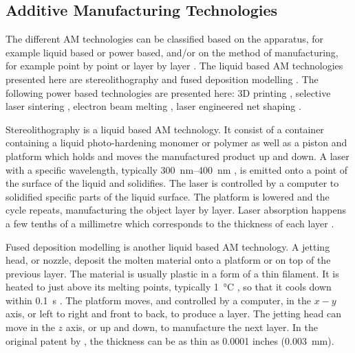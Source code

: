 \subsection{Additive Manufacturing Technologies}

The different AM technologies can be classified based on the apparatus, for example liquid based or power based, and/or on the method of manufacturing, for example point by point or layer by layer \citep{kruth1991material}. The liquid based AM technologies presented here are stereolithography \citep{kodama1981automatic, hull1986apparatus, 3d2019our} and fused deposition modelling \citep{crump1991fused, crump1992apparatus, stratasys2019what}. The following power based technologies are presented here: 3D printing \citep{sachs1990three}, selective laser sintering \citep{deckard1989method, dtm1990the, 3d2019our}, electron beam melting \citep{larsson2004arrangement, arcam2019history}, laser engineered net shaping \citep{atwood1998laser}.

Stereolithography is a liquid based AM technology. It consist of a container containing a liquid photo-hardening monomer or polymer as well as a piston and platform which holds and moves the manufactured product up and down. A laser with a specific wavelength, typically \SIrange{300}{400}{\nano\metre} \citep{kodama1981automatic}, is emitted onto a point of the surface of the liquid and solidifies. The laser is controlled by a computer to solidified specific parts of the liquid surface. The platform is lowered and the cycle repeats, manufacturing the object layer by layer. Laser absorption happens a few tenths of a millimetre which corresponds to the thickness of each layer \citep{kruth1991material, pham1998comparison}.

Fused deposition modelling is another liquid based AM technology. A jetting head, or nozzle, deposit the molten material onto a platform or on top of the previous layer. The material is usually plastic in a form of a thin filament. It is heated to just above its melting points, typically \SI{1}{\degreeCelsius} \citep{crump1992apparatus}, so that it cools down within \SI{0.1}{\second} \citep{kruth1991material}. The platform moves, and controlled by a computer, in the $x-y$ axis, or left to right and front to back, to produce a layer. The jetting head can move in the $z$ axis, or up and down, to manufacture the next layer. In the original patent by \cite{crump1992apparatus}, the thickness can be as thin as 0.0001 inches (\SI{0.003}{\milli\metre}).

